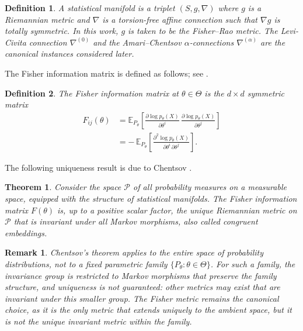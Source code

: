 \documentclass[a4paper,fleqn]{cas-dc}
\newtheorem{theorem}{Theorem}
\newtheorem{definition}{Definition}
\newtheorem{remark}{Remark}
\newcommand{\E}{\mathbb{E}}
\newcommand{\calP}{\mathcal{P}}
\begin{document}
\begin{definition}%
  \label{def:statistical_manifold}
  A \emph{statistical manifold} is a triplet $(S,g,\nabla)$ where $g$ is
  a Riemannian metric and $\nabla$ is a torsion-free affine connection such
  that $\nabla g$ is totally symmetric.
  In this work, $g$ is taken to be the Fisher--Rao metric. The Levi-Civita
  connection $\nabla^{(0)}$ and the Amari--Chentsov
  $\alpha$-connections $\nabla^{(\alpha)}$ are the canonical instances
  considered later.
\end{definition}

The Fisher information matrix is defined as follows; see
\cite{rao1945information,amari2000methods}.

\begin{definition}%
  \label{def:fim}
  The \emph{Fisher information matrix} at $\theta\in\Theta$ is the
  $d\times d$ symmetric matrix
\begin{align}
  F_{ij}(\theta)
  &=
  \E_{P_\theta}\!\left[
    \frac{\partial \log p_\theta(X)}{\partial \theta^i}\,
    \frac{\partial \log p_\theta(X)}{\partial \theta^j}
  \right]
  \nonumber\\
  &=
  -\,\E_{P_\theta}\!\left[
    \frac{\partial^2 \log p_\theta(X)}
         {\partial \theta^i\,\partial \theta^j}
  \right].
  \label{eq:fim_def}
\end{align}
\end{definition}

The following uniqueness result is due to Chentsov
\cite{chentsov1982statistical}.

\begin{theorem}%
  \label{thm:chentsov}
  Consider the space $\calP$ of all probability measures on a measurable
  space, equipped with the structure of statistical manifolds. The Fisher
  information matrix $F(\theta)$ is, up to a positive scalar factor, the
  \emph{unique} Riemannian metric on $\calP$ that is invariant under
  \emph{all} Markov morphisms, also called congruent embeddings.
\end{theorem}

\begin{remark}
  \label{rem:chentsov_scope}
  Chentsov's theorem applies to the \emph{entire} space of probability
  distributions, not to a fixed parametric family
  $\{P_\theta:\theta\in\Theta\}$. For such a family, the invariance
  group is restricted to Markov morphisms that preserve the family
  structure, and uniqueness is \emph{not} guaranteed: other metrics may
  exist that are invariant under this smaller group. The Fisher metric
  remains the \emph{canonical} choice, as it is the only metric that extends uniquely to the ambient space, but it is not the unique invariant metric \emph{within} the family.
\end{remark}
\end{document}

